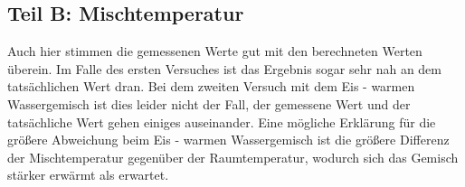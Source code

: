 \documentclass[a4paper]{scrartcl}
\numberwithin{equation}{subsection}
\begin{document}
\subsection{Teil B: Mischtemperatur}
Auch hier stimmen die gemessenen Werte gut mit den berechneten Werten überein. Im Falle des ersten Versuches ist das Ergebnis sogar sehr nah an dem tatsächlichen Wert dran. Bei dem zweiten Versuch mit dem Eis - warmen Wassergemisch ist dies leider nicht der Fall, der gemessene Wert und der tatsächliche Wert gehen einiges auseinander. Eine mögliche Erklärung für die größere Abweichung beim Eis - warmen Wassergemisch ist die größere Differenz der Mischtemperatur gegenüber der Raumtemperatur, wodurch sich das Gemisch stärker erwärmt als erwartet.

\newpage



\label{LastPage}
\end{document}
